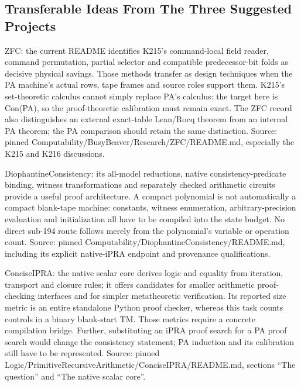 \subsection{Transferable Ideas From The Three Suggested Projects}

ZFC: the current README identifies K215's command-local field reader, command permutation, partial selector and compatible predecessor-bit folds as decisive physical savings. Those methods transfer as design techniques when the PA machine's actual rows, tape frames and source roles support them. K215's set-theoretic calculus cannot simply replace PA's calculus: the target here is Con(PA), so the proof-theoretic calibration must remain exact. The ZFC record also distinguishes an external exact-table Lean/Rocq theorem from an internal PA theorem; the PA comparison should retain the same distinction. Source: pinned Computability/BusyBeaver/Research/ZFC/README.md, especially the K215 and K216 discussions.

DiophantineConsistency: its all-model reductions, native consistency-predicate binding, witness transformations and separately checked arithmetic circuits provide a useful proof architecture. A compact polynomial is not automatically a compact blank-tape machine: constants, witness enumeration, arbitrary-precision evaluation and initialization all have to be compiled into the state budget. No direct sub-194 route follows merely from the polynomial's variable or operation count. Source: pinned Computability/DiophantineConsistency/README.md, including its explicit native-iPRA endpoint and provenance qualifications.

ConciseIPRA: the native scalar core derives logic and equality from iteration, transport and closure rules; it offers candidates for smaller arithmetic proof-checking interfaces and for simpler metatheoretic verification. Its reported size metric is an entire standalone Python proof checker, whereas this task counts controls in a binary blank-start TM. Those metrics require a concrete compilation bridge. Further, substituting an iPRA proof search for a PA proof search would change the consistency statement; PA induction and its calibration still have to be represented. Source: pinned Logic/PrimitiveRecursiveArithmetic/ConciseIPRA/README.md, sections “The question” and “The native scalar core”.
